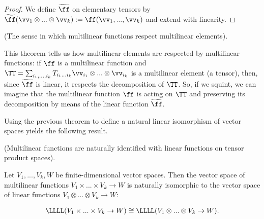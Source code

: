 \begin{proof}
    We define $\widetilde{\ff}$ on elementary tensors by $\widetilde{\ff}(\vv_1 \otimes ... \otimes \vv_k) := \ff(\vv_1, ..., \vv_k)$ and extend with linearity.
\end{proof}

\begin{remark}
    (The sense in which multilinear functions respect multilinear elements).
        
   This theorem tells us how multilinear elements are respected by multilinear functions: if $\ff$ is a multilinear function and $\TT = \sum_{i_1, ..., i_k} T_{i_1 ... i_k} \vv_{i_1} \otimes ... \otimes \vv_{i_k}$ is a multilinear element (a tensor), then, since $\widetilde{\ff}$ is linear, it respects the decomposition of $\TT$. So, if we squint, we can imagine that the multilinear function $\ff$ is acting on $\TT$ and preserving its decomposition by means of the linear function $\widetilde{\ff}$.
\end{remark}

Using the previous theorem to define a natural linear isomorphism of vector spaces yields the following result.

\begin{theorem}
\label{ch::motivated_intro::thm::multilin_fns_iso_lin_fns}
    (Multilinear functions are naturally identified with linear functions on tensor product spaces).
    
    Let $V_1, ..., V_k, W$ be finite-dimensional vector spaces. Then the vector space of multilinear functions ${V_1 \times ... \times V_k \rightarrow W}$ is naturally isomorphic to the vector space of linear functions ${V_1 \otimes ... \otimes V_k \rightarrow W}$:
    
    \begin{align*}
        \LLLL(V_1 \times ... \times V_k \rightarrow W) \cong \LLLL(V_1 \otimes ... \otimes V_k \rightarrow W).
    \end{align*}
\end{theorem}

